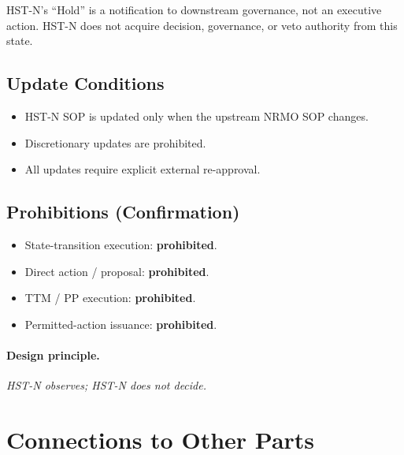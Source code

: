 \noindent
HST-N's ``Hold'' is a notification to downstream governance, not an
executive action. HST-N does not acquire decision, governance, or veto
authority from this state.

\subsection{Update Conditions}
\label{sec:hstn-v11-update-conditions}

\begin{itemize}
\item HST-N SOP is updated only when the upstream NRMO SOP
changes.
\item Discretionary updates are prohibited.
\item All updates require explicit external re-approval.
\end{itemize}

\subsection{Prohibitions (Confirmation)}
\label{sec:hstn-v11-prohibitions}

\begin{itemize}
\item State-transition execution: \textbf{prohibited}.
\item Direct action / proposal: \textbf{prohibited}.
\item TTM / PP execution: \textbf{prohibited}.
\item Permitted-action issuance: \textbf{prohibited}.
\end{itemize}

\paragraph{Design principle.}
\textit{HST-N observes; HST-N does not decide.}

\section*{Connections to Other Parts}

